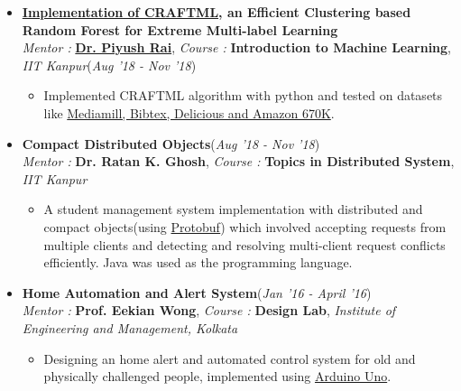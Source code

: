 \documentclass[10pt]{extarticle}
\begin{document}
\begin{itemize}



\item \textbf{ \href{https://github.com/NirjharRoy/CRAFTML}{Implementation of CRAFTML}, an Efficient Clustering based Random Forest for Extreme Multi-label Learning} \\
{\textit{Mentor : }}\textbf{\href{https://www.cse.iitk.ac.in/users/piyush/}{Dr. Piyush Rai}}, \textit{{Course : }}\textbf{Introduction to Machine Learning}, \textit{IIT Kanpur}\hfill\hfill(\textit{Aug '18 - Nov '18})
\begin{itemize}
\item Implemented CRAFTML algorithm with python and tested on datasets like \href{http://manikvarma.org/downloads/XC/XMLRepository.html}{Mediamill, Bibtex, Delicious and Amazon 670K}.

\end{itemize}






\item \textbf{Compact Distributed Objects}\hfill\hfill(\textit{Aug '18 - Nov '18})\\{\textit{Mentor : }}\textbf{{Dr. Ratan K. Ghosh}}, \textit{{Course : }}\textbf{Topics in Distributed System}, \textit{IIT Kanpur}
\begin{itemize}
\item A student management system implementation with distributed and compact objects(using \href{https://developers.google.com/protocol-buffers}{Protobuf}) which involved accepting requests from multiple clients and detecting and resolving multi-client request conflicts efficiently. Java was used as the programming language.
\end{itemize}







\item \textbf{Home Automation and Alert System}\hfill\hfill(\textit{Jan '16 - April '16})\\{\textit{Mentor : }}\textbf{{Prof. Eekian Wong}}, \textit{{Course : }}\textbf{Design Lab}, \textit{Institute of Engineering and Management, Kolkata}
\begin{itemize}
\item Designing an home alert and automated control system for old and physically challenged people, implemented using \href{https://www.arduino.cc/en/Guide/ArduinoUno}{Arduino Uno}.
\end{itemize}




\end{itemize}
\end{document}
